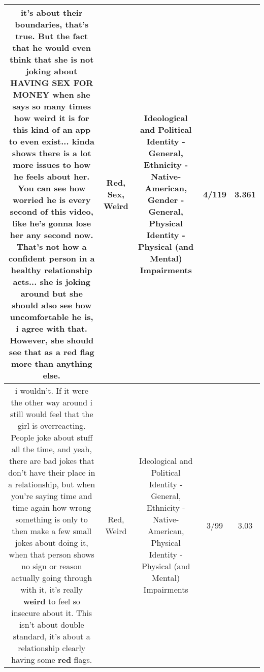 \documentclass[11pt]{article}
\newlength\mylength
\begin{document}
\begin{center}
\begin{longtable}{|C{.65\mylength}|C{.30\mylength}|C{.12\mylength}|C{.12\mylength}|C{.12\mylength}|}
  \small {} it's about their boundaries, that's true. But the fact that he would even think that she is not joking about HAVING \textbf{SEX} FOR MONEY when she says so many times how \textbf{weird} it is for this kind of an app to even exist... kinda shows there is a lot more issues to how he feels about her. You can see how worried he is every second of this video, like he's gonna lose her any second now. That's not how a confident person in a healthy relationship acts... she is joking around but she should also see how uncomfortable he is, i agree with that. However, she should see that as a \textbf{r\textbf{ed}} flag more than anything else.\normalsize   & Red, Sex, Weird &  Ideological and Political Identity - General, Ethnicity - Native-American, Gender - General, Physical Identity - Physical (and Mental) Impairments & 4/119 & 3.361 \\  \hline
  \small {} i wouldn't. If it were the other way around i still would feel that the girl is overreacting. People joke about stuff all the time, and yeah, there are bad jokes that don't have their place in a relationship, but when you're saying time and time again how wrong something is only to then make a few small jokes about doing it, when that person shows no sign or reason actually going through with it, it's really \textbf{weird} to feel so insecure about it. This isn't about double standard, it's about a relationship clearly having some \textbf{r\textbf{ed}} flags.\normalsize   & Red, Weird &  Ideological and Political Identity - General, Ethnicity - Native-American, Physical Identity - Physical (and Mental) Impairments & 3/99 & 3.03 \\  \hline

\end{longtable}
\end{center}
\end{document}
